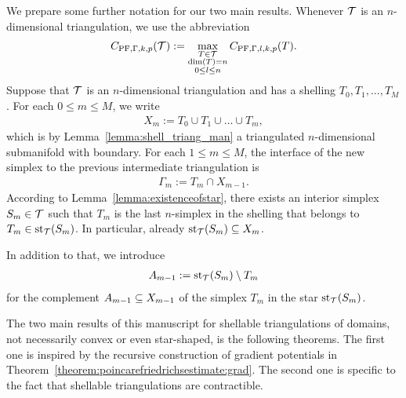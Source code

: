 \documentclass[10pt,a4paper]{article}
\begin{document}
We prepare some further notation for our two main results. 
Whenever ${\mathcal T}$ is an $n$-dimensional triangulation, we use the abbreviation
\begin{align*}
    C_{{\rm PF},\Gamma,k,p}({\mathcal T}) 
    :=
    \max\limits_{ \substack{ T \in {\mathcal T} \\ \dim(T)=n \\ 0 \leq l \leq n } }
    C_{{\rm PF},\Gamma,l,k,p}(T)
    .
\end{align*}
Suppose that ${\mathcal T}$ is an $n$-dimensional triangulation and has a shelling $T_{0}, T_{1}, \dots, T_{M}$. 
For each $0 \leq m \leq M$, we write 
\begin{align*}
    X_{m} := T_0 \cup T_1 \cup \dots \cup T_{m},
\end{align*}
which is by Lemma~\ref{lemma:shell_triang_man} a triangulated $n$-dimensional submanifold with boundary. 
For each $1 \leq m \leq M$, the interface of the new simplex to the previous intermediate triangulation is 
\begin{align*}
    \Gamma_{m} := T_{m} \cap X_{m-1} %
    .
\end{align*}
According to Lemma~\ref{lemma:existenceofstar}, 
there exists an interior simplex $S_{m} \in {\mathcal T}$ 
such that $T_{m}$ is the last $n$-simplex in the shelling that belongs to $T_{m} \in \operatorname{st}_{{\mathcal T}}(S_{m})$.
In particular, already $\operatorname{st}_{{\mathcal T}}(S_{m}) \subseteq X_{m}$. %

In addition to that, we introduce 
\begin{align*}
    A_{m-1} := \operatorname{st}_{{\mathcal T}}(S_{m}) \setminus T_{m}
\end{align*}
for the complement $A_{m-1} \subseteq X_{m-1}$ of the simplex $T_{m}$ in the star $\operatorname{st}_{{\mathcal T}}(S_{m})$. 

The two main results of this manuscript for shellable triangulations of domains, not necessarily convex or even star-shaped, is the following theorems. 
The first one is inspired by the recursive construction of gradient potentials in Theorem~\ref{theorem:poincarefriedrichsestimate:grad}.
The second one is specific to the fact that shellable triangulations are contractible.
\end{document}
